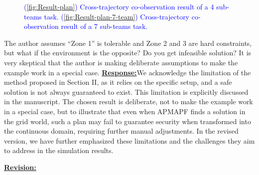 \documentclass{article}
\newcommand{\re}{\tcblower \underline{\textbf{Response:}}\quad}
\newcommand{\rv}{{\large{\underline{\textbf{Revision:}}}}\quad}
\newcommand{\new}[1]{\textcolor{blue}{#1}}
\begin{document}
  \begin{figure}[H]
	\centering
	\caption{\new{(\ref{fig:Result-plan}) Cross-trajectory co-observation result of a 4 sub-teams task. (\ref{fig:Result-plan-7-team}) Cross-trajectory co-observation result of a 7 sub-teams task.}}\label{fig:Cross-trajectory-result}
  \end{figure}
\vspace{0.2cm}

\begin{cmt}{}{}
	The author assumes “Zone 1” is tolerable and Zone 2 and 3 are hard
constraints, but what if the environment is the opposite? Do you get
infeasible solution? It is very skeptical that the author is making
deliberate assumptions to make the example work in a special case.
\re We acknowledge the limitation of the method proposed in Section II, as it relies on the specific setup, and a safe solution is not always guaranteed to exist. This limitation is explicitly discussed in the manuscript. The chosen result is deliberate, not to make the example work in a special case, but to illustrate that even when APMAPF finds a solution in the grid world, such a plan may fail to guarantee security when transformed into the continuous domain, requiring further manual adjustments. In the revised version, we have further emphasized these limitations and the challenges they aim to address in the simulation results.
\end{cmt}
\vspace{0.1cm}
\rv
\renewcommand\thesubsection{H}
\end{document}

